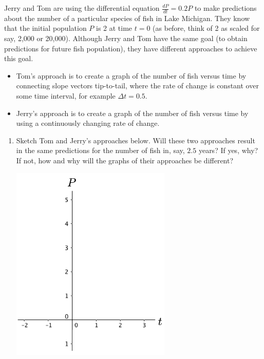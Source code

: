 \pagestyle{fancy}
\renewcommand{\theUnit}{3}
\ifthenelse{\isundefined{\UnitPageNumbers}}{}{\setcounter{page}{1}}
\rhead{Unit \theUnit: An Analytic Approach}
\rfoot{\mypage}
\lfoot{}
\cfoot{}
\renewcommand{\footrulewidth}{.4pt}
\vspace*{-20pt} \thispagestyle{firstfooter}

Jerry and Tom are using the differential equation $\displaystyle\frac{dP}{dt} = 0.2P$ to make predictions about the number of a particular species of fish in Lake Michigan. They know that the initial population $P$ is 2 at time $t = 0$ (as before, think of 2 as scaled for say, 2,000 or 20,000).
 \vs
Although Jerry and Tom have the same goal (to obtain predictions for future fish population), they have different approaches to achieve this goal. 

\begin{itemize}
\item	Tom's approach is to create a graph of the number of fish versus time by connecting slope vectors tip-to-tail, where the rate of change is constant over some time interval, for example $\Delta t=0.5$. 
\item Jerry's approach is to create a graph of the number of fish versus time by using a continuously changing rate of change. 

\end{itemize}
\begin{enumerate}

\item Sketch Tom and Jerry's approaches below. Will these two approaches result in the same predictions for the number of fish in, say, $2.5$ years? If yes, why? If not, how and why will the graphs of their approaches be different?\label{03problem1}
\begin{center}
\includegraphics[width=3in]{03/03TomJerry.png}
\end{center}
\end{enumerate}
\clearpage

